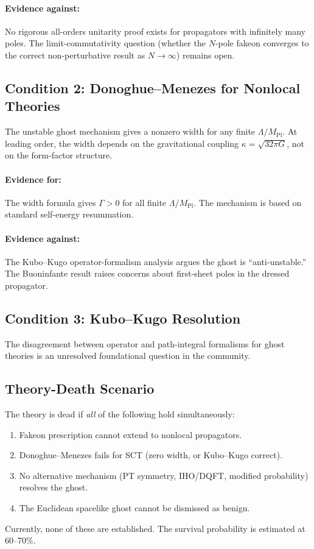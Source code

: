 \documentclass[11pt,a4paper]{article}
\newcommand{\MPl}{M_{\mathrm{Pl}}}
\begin{document}
\paragraph{Evidence against:} No rigorous all-orders unitarity proof
exists for propagators with infinitely many poles.  The
limit-commutativity question (whether the $N$-pole fakeon converges to
the correct non-perturbative result as $N \to \infty$) remains open.

\subsection{Condition 2: Donoghue--Menezes for Nonlocal Theories}

The unstable ghost mechanism \cite{Donoghue2019} gives a nonzero width
for any finite $\Lambda/\MPl$.  At leading order, the width depends on
the gravitational coupling $\kappa = \sqrt{32\pi G}$, not on the
form-factor structure.

\paragraph{Evidence for:} The width formula gives $\Gamma > 0$ for all
finite $\Lambda/\MPl$.  The mechanism is based on standard self-energy
resummation.

\paragraph{Evidence against:} The Kubo--Kugo operator-formalism analysis
\cite{KuboKugo2023} argues the ghost is ``anti-unstable.''  The
Buoninfante result \cite{Buoninfante2025} raises concerns about
first-sheet poles in the dressed propagator.

\subsection{Condition 3: Kubo--Kugo Resolution}

The disagreement between operator and path-integral formalisms for ghost
theories is an unresolved foundational question in the community.

\subsection{Theory-Death Scenario}

The theory is dead if \emph{all} of the following hold simultaneously:
\begin{enumerate}[nosep]
  \item Fakeon prescription cannot extend to nonlocal propagators.
  \item Donoghue--Menezes fails for SCT (zero width, or Kubo--Kugo
    correct).
  \item No alternative mechanism (PT symmetry, IHO/DQFT, modified
    probability) resolves the ghost.
  \item The Euclidean spacelike ghost cannot be dismissed as benign.
\end{enumerate}
Currently, none of these are established.  The survival probability is
estimated at 60--70\%.
\end{document}
